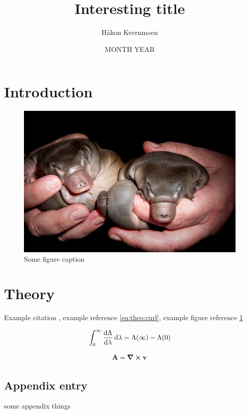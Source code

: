 \documentclass[twocolumn,english,notitlepage]{article}
\title{Interesting title}
\author{Håkon Kvernmoen}
\date{MONTH YEAR}
\begin{document}
\maketitle

\section{Introduction}

\begin{figure}[H]
    \centering
    \includegraphics[width=0.5\linewidth]{Young-Platypus.jpg}
    \caption{Some figure caption}
    \label{fig:intro:plat}
\end{figure}

\section{Theory}
Example citation \cite{DFTgap}, example reference \eqref{eq:theo:curl}, example figure reference \ref{fig:intro:plat}

\begin{align}
	\int_{0}^{\infty} \dv{\Lambda}{\lambda} \dd{\lambda} = \Lambda(\infty) - \Lambda(0) \label{eq:theo:lambda}
\end{align}

\begin{align}
	\vb{A} = \curl{\vb{v}} \label{eq:theo:curl}  
\end{align}

\begin{appendix}
    \section{Appendix entry}
    some appendix things
\end{appendix}

\printbibliography
\end{document}
